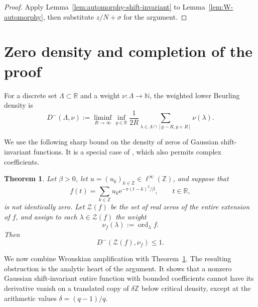 \documentclass[11pt]{amsart}
\numberwithin{equation}{section}
\newtheorem{theorem}{Theorem}[section]
\theoremstyle{definition}
\theoremstyle{remark}
\newcommand{\R}{\mathbb R}
\newcommand{\Z}{\mathbb Z}
\newcommand{\N}{\mathbb N}
\newcommand{\e}{\mathrm e}
\newcommand{\cZ}{\mathcal Z}
\newcommand{\ord}{\operatorname{ord}}
\begin{document}
\begin{proof}
Apply Lemma~\ref{lem:automorphy-shift-invariant} to Lemma~\ref{lem:W-automorphy}, then substitute $z/N+\sigma$ for the argument.
\end{proof}

\section{Zero density and completion of the proof}\label{sec:zero_density_proof}

For a discrete set $\Lambda\subset\R$ and a weight $\nu\colon\Lambda\to\N$, the weighted lower Beurling density is
\begin{equation} \label{eq:weighted-density}
    D^-(\Lambda,\nu)
    :=
    \liminf_{R\to\infty}\inf_{y\in\R}
    \frac{1}{2R}
    \sum_{\lambda\in\Lambda\cap[y-R,y+R]}\nu(\lambda).
\end{equation}

We use the following sharp bound on the density of zeros of Gaussian shift-invariant functions. It is a special case of \cite[Theorem~4.3]{GRSderivatives}, which also permits complex coefficients.

\begin{theorem}\label{thm:zero-density}
    Let $\beta>0$, let $u=(u_k)_{k\in\Z}\in\ell^\infty(\Z)$, and suppose that
    \begin{equation}
        f(t)
        =
        \sum_{k\in\Z}u_k\e^{-\pi(t-k)^2/\beta},
        \qquad t\in\R,
    \end{equation}
    is not identically zero. Let $\cZ(f)$ be the set of real zeros of the entire extension of $f$, and assign to each $\lambda\in\cZ(f)$ the weight
    \begin{equation}
        \nu_f(\lambda):=\ord_\lambda f.
    \end{equation}
    Then
    \begin{equation}
        D^-(\cZ(f),\nu_f)\leq1.
    \end{equation}
\end{theorem}

We now combine Wronskian amplification with Theorem~\ref{thm:zero-density}. The resulting obstruction is the analytic heart of the argument. It shows that a nonzero Gaussian shift-invariant entire function with bounded coefficients cannot have its derivative vanish on a translated copy of $\delta\mathbb Z$ below critical density, except at the arithmetic values $\delta=(q-1)/q$.
\end{document}
